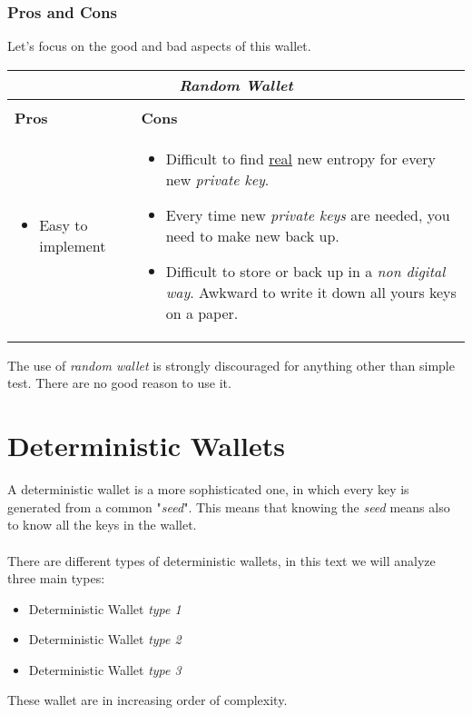 \subsubsection{Pros and Cons}
Let's focus on the good and bad aspects of this wallet.

\begin{center}
	\begin{tabular}{ |p{6cm}|p{6cm}|  }
	\hline
	\multicolumn{2}{|c|}{\textbf{\textit{Random Wallet}}} \\
	\hline \hline 
	\\
	\centerline{\textbf{Pros}}&\centerline{\textbf{Cons}}\\
	\hline
	\begin{itemize}
		\item Easy to implement
	\end{itemize} &
	\begin{itemize}
		\item Difficult to find \underline{real} new entropy for every new \textit{private key}.
		\item Every time new \textit{private keys} are needed, you need to make new back up.
		\item Difficult to store or back up in a \textit{non digital way}. Awkward to write it down all yours keys on a paper.
	\end{itemize}\\
	\hline
\end{tabular}
\end{center}

The use of \textit{random wallet} is strongly discouraged for anything other than simple test. There are no good reason to use it.

\section{Deterministic Wallets}
A deterministic wallet is a more sophisticated one, in which every key is generated from a common "\textit{seed}". This means that knowing the \textit{seed} means also to know all the keys in the wallet.\\ \\
There are different types of deterministic wallets, in this text we will analyze three main types:
\begin{itemize}
	\item Deterministic Wallet \textit{type 1}
	\item Deterministic Wallet \textit{type 2}
	\item Deterministic Wallet \textit{type 3}
\end{itemize}
These wallet are in increasing order of complexity.

